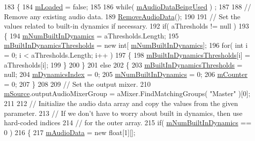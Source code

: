 \begin{DoxyCode}
183     \{
184         \hyperlink{group___n_o_o_priv_var_gaf01d2583555de6a523cdf82808718ca9}{mLoaded} = \textcolor{keyword}{false};
185 
186         \textcolor{keywordflow}{while}( \hyperlink{group___n_o_o_priv_var_ga1efa96121f085b27c7d9e8725f90a336}{mAudioDataBeingUsed} ) ;
187 
188         \textcolor{comment}{// Remove any existing audio data.}
189         \hyperlink{group___n_o_o_priv_func_ga12f593bb5de83dc548eff4617fc687b5}{RemoveAudioData}();
190 
191         \textcolor{comment}{// Set the values related to built-in dynamics if necessary. }
192         \textcolor{keywordflow}{if}( aThresholds != null )
193         \{
194             \hyperlink{group___n_o_o_priv_var_ga3cc04564fcc1b1c4597af18e7e4fbc47}{mNumBuiltInDynamics} = aThresholds.Length;
195             \hyperlink{group___n_o_o_priv_var_ga6a530f5e624caf8087c636df98d7f0b0}{mBuiltInDynamicsThresholds} = \textcolor{keyword}{new} \textcolor{keywordtype}{int}[
      \hyperlink{group___n_o_o_priv_var_ga3cc04564fcc1b1c4597af18e7e4fbc47}{mNumBuiltInDynamics}];
196             \textcolor{keywordflow}{for}( \textcolor{keywordtype}{int} i = 0; i < aThresholds.Length; i++ )
197             \{
198                 \hyperlink{group___n_o_o_priv_var_ga6a530f5e624caf8087c636df98d7f0b0}{mBuiltInDynamicsThresholds}[i] = aThresholds[i];
199             \}
200         \}
201         \textcolor{keywordflow}{else}
202         \{
203             \hyperlink{group___n_o_o_priv_var_ga6a530f5e624caf8087c636df98d7f0b0}{mBuiltInDynamicsThresholds} = null;
204             \hyperlink{group___n_o_o_priv_var_gaf0c9c2a90b5d73b8ffa0906bc69acdbc}{mDynamicsIndex} = 0;
205             \hyperlink{group___n_o_o_priv_var_ga3cc04564fcc1b1c4597af18e7e4fbc47}{mNumBuiltInDynamics} = 0;
206             \hyperlink{group___n_o_o_priv_var_ga5dca97be8d58837ace4ea6f4a972b20a}{mCounter} = 0;
207         \}
208 
209         \textcolor{comment}{// Set the output mixer.}
210         \hyperlink{group___n_o_o_priv_var_gad5e14a91b348e61166dbf6b6cf13649c}{mSource}.outputAudioMixerGroup = aMixer.FindMatchingGroups( \textcolor{stringliteral}{"Master"} )[0];
211 
212         \textcolor{comment}{// Initialize the audio data array and copy the values from the given parameter.}
213         \textcolor{comment}{// If we don't have to worry about built in dynamics, then use hard-coded indices }
214         \textcolor{comment}{// for the outer array.}
215         \textcolor{keywordflow}{if}( \hyperlink{group___n_o_o_priv_var_ga3cc04564fcc1b1c4597af18e7e4fbc47}{mNumBuiltInDynamics} == 0 )
216         \{
217             \hyperlink{group___n_o_o_priv_var_ga842eef5bfade070f914b8a551b3bcf43}{mAudioData} = \textcolor{keyword}{new} \textcolor{keywordtype}{float}[1][];

\end{DoxyCode}
